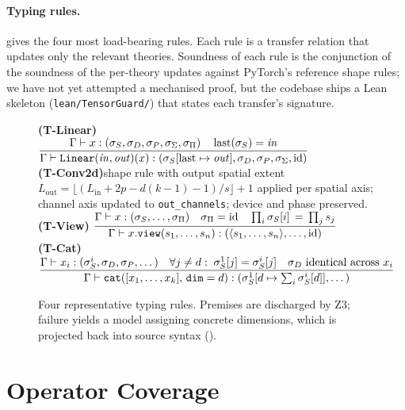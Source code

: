 \documentclass{article}
\theoremstyle{plain}
\theoremstyle{definition}
\newcommand{\infrule}[3][]{%
  \ensuremath{\dfrac{#2}{#3}\;\text{\scriptsize\textsc{#1}}}}
\newcommand{\code}[1]{\texttt{\small #1}}
\DeclareMathOperator{\last}{last}
\begin{document}
\paragraph{Typing rules.}
 gives the four most load-bearing rules.  Each rule
is a transfer relation that updates only the relevant theories.
Soundness of each rule is the conjunction of the soundness of
the per-theory updates against PyTorch's reference shape rules; we
have not yet attempted a mechanised proof, but the codebase ships a
Lean skeleton (\code{lean/TensorGuard/}) that states each
transfer's signature.

\begin{figure}[t]
\centering
\begin{mdframed}[backgroundcolor=gray!3,linecolor=gray!50,innertopmargin=4pt,innerbottommargin=4pt,innerleftmargin=6pt,innerrightmargin=6pt]
\small
\textbf{(T-Linear)}\;
\infrule
  {\Gamma \vdash x : (\sigma_S,\sigma_D,\sigma_P,\sigma_{\Sigma},\sigma_\Pi)
   \quad
   \last(\sigma_S) = \mathit{in}}
  {\Gamma \vdash \mathtt{Linear}(\mathit{in},\mathit{out})(x)
    : (\sigma_S[\last \mapsto \mathit{out}],\sigma_D,\sigma_P,\sigma_{\Sigma},\mathrm{id})}
\\[6pt]
\textbf{(T-Conv2d)}\quad shape rule with output spatial extent
$L_\text{out} = \lfloor (L_\text{in} + 2p - d(k-1) - 1)/s \rfloor + 1$
applied per spatial axis; channel axis updated to
\code{out\_channels}; device and phase preserved.
\\[6pt]
\textbf{(T-View)}\;
\infrule
  {\Gamma \vdash x : (\sigma_S,\dots,\sigma_\Pi) \quad
   \sigma_\Pi = \mathrm{id} \quad
   \prod_i \sigma_S[i] \,=\, \prod_j s_j}
  {\Gamma \vdash x.\mathtt{view}(s_1,\ldots,s_n) : (\langle s_1,\ldots,s_n\rangle,\dots,\mathrm{id})}
\\[6pt]
\textbf{(T-Cat)}\;
\infrule
  {\Gamma \vdash x_i : (\sigma_S^i,\sigma_D,\sigma_P,\dots) \quad
   \forall j \neq d:\; \sigma_S^1[j] = \sigma_S^i[j] \quad
   \sigma_D \text{ identical across } x_i}
  {\Gamma \vdash \mathtt{cat}([x_1,\ldots,x_k],\, \mathtt{dim}=d)
   : (\sigma_S^1[d \mapsto \textstyle\sum_i \sigma_S^i[d]],\dots)}
\end{mdframed}
\caption{Four representative typing rules.  Premises are
discharged by Z3; failure yields a model assigning concrete
dimensions, which is projected back into source syntax
().}
\label{fig:rules}
\end{figure}

\section{Operator Coverage}\label{sec:operators}
\end{document}
